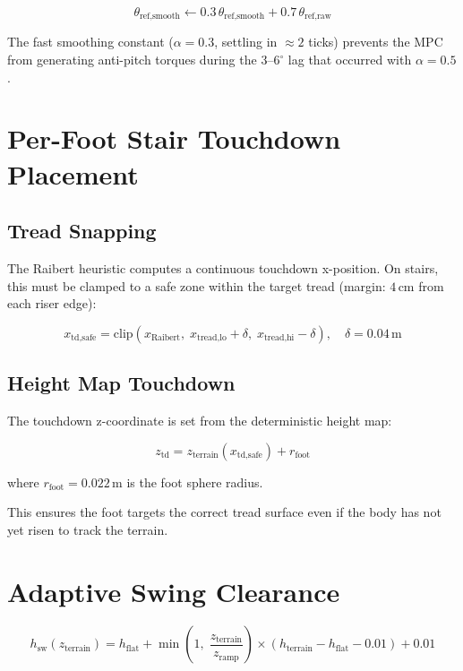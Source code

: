 \documentclass[12pt,a4paper]{report}
\begin{document}
\begin{equation}
    \theta_\text{ref,smooth} \leftarrow 0.3\,\theta_\text{ref,smooth} + 0.7\,\theta_\text{ref,raw}
\end{equation}

The fast smoothing constant ($\alpha = 0.3$, settling in $\approx 2$ ticks)
prevents the MPC from generating anti-pitch torques during the $3$--$6^\circ$
lag that occurred with $\alpha = 0.5$.

\section{Per-Foot Stair Touchdown Placement}

\subsection{Tread Snapping}

The Raibert heuristic computes a continuous touchdown x-position.  On stairs,
this must be clamped to a safe zone within the target tread (margin: $4\,\text{cm}$
from each riser edge):

\begin{equation}
    x_\text{td,safe} = \text{clip}\!\left(x_\text{Raibert},\;
    x_\text{tread,lo} + \delta, \;
    x_\text{tread,hi} - \delta \right), \quad \delta = 0.04\,\text{m}
\end{equation}

\subsection{Height Map Touchdown}

The touchdown z-coordinate is set from the deterministic height map:

\begin{equation}
    z_\text{td} = z_\text{terrain}(x_\text{td,safe}) + r_\text{foot}
\end{equation}

where $r_\text{foot} = 0.022\,\text{m}$ is the foot sphere radius.

This ensures the foot targets the correct tread surface even if the body has
not yet risen to track the terrain.

\section{Adaptive Swing Clearance}

\begin{equation}
    h_\text{sw}(z_\text{terrain}) =
    h_\text{flat} + \min\!\left(1,\; \frac{z_\text{terrain}}{z_\text{ramp}}\right)
    \times (h_\text{terrain} - h_\text{flat} - 0.01) + 0.01
\end{equation}
\end{document}
